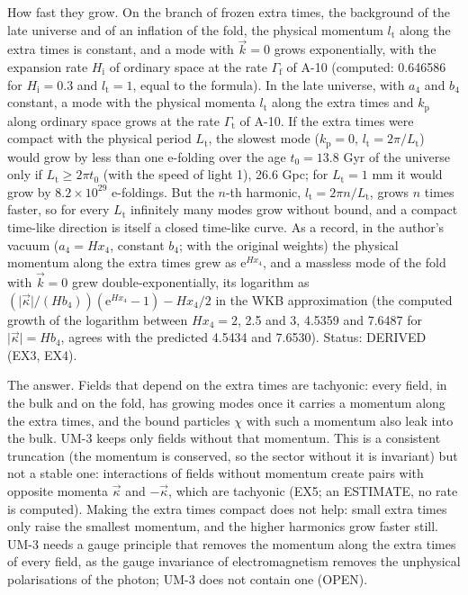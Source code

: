 \documentclass[
  10pt,
]{article}
\begin{document}
How fast they grow. On the branch of frozen extra times, the background
of the late universe and of an inflation of the fold, the physical
momentum \(l_{\mathrm{t}}\) along the extra times is constant, and a
mode with \(\vec k = 0\) grows exponentially, with the expansion rate
\(H_{\mathrm{i}}\) of ordinary space at the rate \(\Gamma_{\mathrm{f}}\)
of A-10 (computed: 0.646586 for \(H_{\mathrm{i}} = 0.3\) and
\(l_{\mathrm{t}} = 1\), equal to the formula). In the late universe,
with \(a_4\) and \(b_4\) constant, a mode with the physical momenta
\(l_{\mathrm{t}}\) along the extra times and \(k_{\mathrm{p}}\) along
ordinary space grows at the rate \(\Gamma_{\mathrm{t}}\) of A-10. If the
extra times were compact with the physical period \(L_{\mathrm{t}}\),
the slowest mode (\(k_{\mathrm{p}} = 0\),
\(l_{\mathrm{t}} = 2\pi/L_{\mathrm{t}}\)) would grow by less than one
e-folding over the age \(t_0 = 13.8\) Gyr of the universe only if
\(L_{\mathrm{t}} \ge 2\pi t_0\) (with the speed of light 1), 26.6 Gpc;
for \(L_{\mathrm{t}} = 1\) mm it would grow by \(8.2\times10^{29}\)
e-foldings. But the \(n\)-th harmonic,
\(l_{\mathrm{t}} = 2\pi n/L_{\mathrm{t}}\), grows \(n\) times faster, so
for every \(L_{\mathrm{t}}\) infinitely many modes grow without bound,
and a compact time-like direction is itself a closed time-like curve. As
a record, in the author's vacuum (\(a_4 = Hx_4\), constant \(b_4\); with
the original weights) the physical momentum along the extra times grew
as \(\mathrm{e}^{Hx_4}\), and a massless mode of the fold with
\(\vec k = 0\) grew double-exponentially, its logarithm as
\((\lvert\vec\kappa\rvert/(Hb_4))(\mathrm{e}^{Hx_4} - 1) - Hx_4/2\) in
the WKB approximation (the computed growth of the logarithm between
\(Hx_4 = 2\), 2.5 and 3, 4.5359 and 7.6487 for
\(\lvert\vec\kappa\rvert = Hb_4\), agrees with the predicted 4.5434 and
7.6530). Status: DERIVED (EX3, EX4).

The answer. Fields that depend on the extra times are tachyonic: every
field, in the bulk and on the fold, has growing modes once it carries a
momentum along the extra times, and the bound particles \(\chi\) with
such a momentum also leak into the bulk. UM-3 keeps only fields without
that momentum. This is a consistent truncation (the momentum is
conserved, so the sector without it is invariant) but not a stable one:
interactions of fields without momentum create pairs with opposite
momenta \(\vec\kappa\) and \(-\vec\kappa\), which are tachyonic (EX5; an
ESTIMATE, no rate is computed). Making the extra times compact does not
help: small extra times only raise the smallest momentum, and the higher
harmonics grow faster still. UM-3 needs a gauge principle that removes
the momentum along the extra times of every field, as the gauge
invariance of electromagnetism removes the unphysical polarisations of
the photon; UM-3 does not contain one (OPEN).
\end{document}
